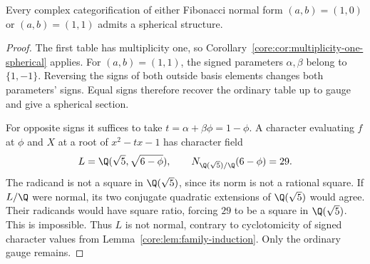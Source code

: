 \begin{proposition}\label{fib:prop:small-spherical}
Every complex categorification of either Fibonacci normal form
$(a,b)=(1,0)$ or $(a,b)=(1,1)$ admits a spherical structure.
\end{proposition}
\begin{proof}
The first table has multiplicity one, so
Corollary~\ref{core:cor:multiplicity-one-spherical} applies.
For $(a,b)=(1,1)$, the signed parameters $\alpha,\beta$ belong to
$\{1,-1\}$. Reversing the signs of both outside basis elements changes
both parameters' signs. Equal signs therefore recover the ordinary
table up to gauge and give a spherical section.

For opposite signs it suffices to take
$t=\alpha+\beta\phi=1-\phi$. A character evaluating $f$ at $\phi$
and $X$ at a root of $x^2-tx-1$ has character field
\[
 L=\Q(\sqrt5,\sqrt{6-\phi}),\qquad
 N_{\Q(\sqrt5)/\Q}(6-\phi)=29.
\]
The radicand is not a square in $\Q(\sqrt5)$, since its norm
is not a rational square. If $L/\Q$ were normal, its two
conjugate quadratic extensions of $\Q(\sqrt5)$ would agree.
Their radicands would have square ratio, forcing $29$ to be a square
in $\Q(\sqrt5)$. This is impossible. Thus $L$ is not normal,
contrary to cyclotomicity of signed character values from
Lemma~\ref{core:lem:family-induction}. Only the ordinary gauge remains.
\end{proof}

